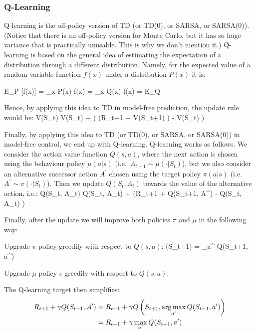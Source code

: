 \subsubsection{Q-Learning}

Q-learning is the off-policy version of TD (or TD(0), or SARSA, or SARSA(0)). (Notice that there is an off-policy
version for Monte Carlo, but it has so huge variance that is practically unusable. This is why we don't mention it.)
\v

Q-learning is based on the general idea of estimating the expectation of a distribution through a different
distribution. Namely, for the expected value of a random variable function $f(x)$ under a distribution $P(x)$ it is:

\bse
E_{P} [f(x)] = \sum_{x} P(x) \cdot f(x) = \sum_{x} Q(x) \cdot {} \cdot f(x) = E_{Q} 
\ese

\vspace{-10pt}

Hence, by applying this idea to TD in model-free prediction, the update rule would be:
\bse
V(S_t) \gets V(S_t) + \alpha \left(  \left(R_{t+1} + \gamma V(S_{t+1}) \right)
- V(S_t) \right)
\ese

Finally, by applying this idea to TD (or TD(0), or SARSA, or SARSA(0)) in model-free control, we end up with
Q-learning. Q-learning works as follows. We consider the action value function $Q(s,a)$, where the next action is
chosen using the behaviour policy $\mu(a|s)$ (i.e.\ $A_{t+1} \sim \mu(\cdot|S_t)$), but we also consider an
alternative successor action $A^\prime$ chosen using the target policy $\pi(a|s)$ (i.e.\ $A^\prime \sim
\pi(\cdot|S_t)$). Then we update $Q(S_t, A_t)$ towards the value of the alternative action, i.e.:
\bse
Q(S_t, A_t) \gets Q(S_t, A_t) + \alpha \left(R_{t+1} + \gamma Q(S_{t+1}, A^\prime) - Q(S_t, A_t) \right)
\ese

Finally, after the update we will improve both policies $\pi$ and $\mu$ in the following way:
\bit
\item Upgrade $\pi$ policy greedily with respect to $Q(s,a)$:
\bse
\pi(S_{t+1}) = \argmax_{a^\prime} Q(S_{t+1}, a^\prime)
\ese

\item Upgrade $\mu$ policy $\epsilon$-greedily with respect to $Q(s,a)$.
\eit

The Q-learning target then simplifies:
{\setlength{\jot}{10pt}
\begin{align*}
R_{t+1} + \gamma Q(S_{t+1}, A^\prime) &= R_{t+1} + \gamma Q \left(S_{t+1}, \operatorname*{arg\,max}_{a^\prime} Q(S_{t+1}, a^\prime)
\right) \\
&= R_{t+1} + \gamma \max_{a^\prime} Q(S_{t+1}, a^\prime)
\end{align*}}

